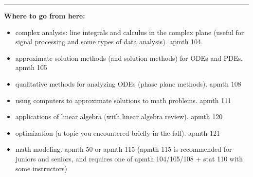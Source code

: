\documentclass[12pt,letterpaper,noanswers]{exam}
\begin{document}





\vspace{0.2cm}
\hrule
\vspace{0.2cm}

\noindent\textbf{Where to go from here:}
\begin{tcolorbox}
\begin{itemize}
\itemsep0em
    \item complex analysis: line integrals and calculus in the complex plane (useful for signal processing and some types of data analysis).  apmth 104.
    \item approximate solution methods (and solution methods) for ODEs and PDEs.  apmth 105
    \item qualitative methods for analyzing ODEs (phase plane methods).  apmth 108
    \item using computers to approximate solutions to math problems.  apmth 111
    \item applications of linear algebra (with linear algebra review).  apmth 120
    \item optimization (a topic you encountered briefly in the fall).  apmth 121
    \item math modeling.  apmth 50 or apmth 115 (apmth 115 is recommended for juniors and seniors, and requires one of apmth 104/105/108 + stat 110 with some instructors)
\end{itemize}
\end{tcolorbox}
\end{document}
